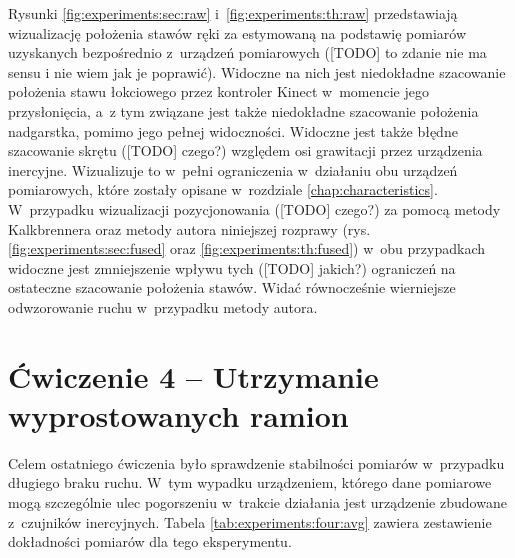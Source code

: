 Rysunki \ref{fig:experiments:sec:raw} i~\ref{fig:experiments:th:raw} przedstawiają wizualizację położenia stawów ręki za estymowaną na podstawię pomiarów uzyskanych bezpośrednio z~urządzeń pomiarowych ([TODO] to zdanie nie ma sensu i nie wiem jak je poprawić). Widoczne na nich jest niedokładne szacowanie położenia stawu łokciowego przez kontroler Kinect w~momencie jego przysłonięcia, a~z tym związane jest także niedokładne szacowanie położenia nadgarstka, pomimo jego pełnej widoczności. Widoczne jest także błędne szacowanie skrętu ([TODO] czego?) względem osi grawitacji przez urządzenia inercyjne. Wizualizuje to w~pełni ograniczenia w~działaniu obu urządzeń pomiarowych, które zostały opisane w~rozdziale \ref{chap:characteristics}. W~przypadku wizualizacji pozycjonowania ([TODO] czego?) za pomocą metody Kalkbrennera oraz metody autora niniejszej rozprawy (rys. \ref{fig:experiments:sec:fused} oraz \ref{fig:experiments:th:fused}) w~obu przypadkach widoczne jest zmniejszenie wpływu tych ([TODO] jakich?) ograniczeń na ostateczne szacowanie położenia stawów. Widać równocześnie wierniejsze odwzorowanie ruchu w~przypadku metody autora.\\

\section*{Ćwiczenie 4 -- Utrzymanie wyprostowanych ramion}
Celem ostatniego ćwiczenia było sprawdzenie stabilności pomiarów w~przypadku długiego braku ruchu. W~tym wypadku urządzeniem, którego dane pomiarowe mogą szczególnie ulec pogorszeniu w~trakcie działania jest urządzenie zbudowane z~czujników inercyjnych. Tabela \ref{tab:experiments:four:avg} zawiera zestawienie dokładności pomiarów dla tego eksperymentu.

